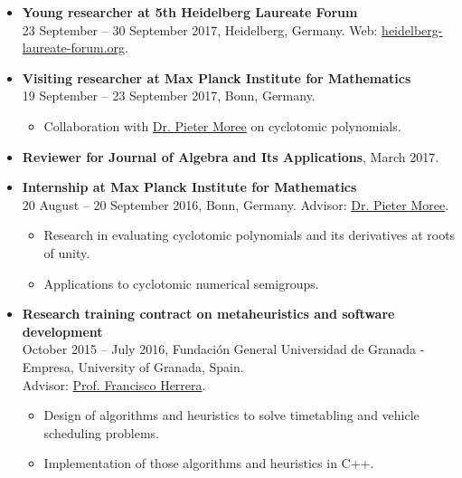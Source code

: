 \documentclass[10pt,a4paper,sans]{moderncv} %
\begin{document}
\begin{itemize}
\item \textbf{Young researcher at 5th Heidelberg Laureate Forum} \\
  23 September -- 30 September 2017, Heidelberg, Germany. Web: \textcolor{colorl}{ \url{heidelberg-laureate-forum.org}}.
\item \textbf{Visiting researcher at Max Planck Institute for Mathematics} \\
  19 September -- 23 September 2017, Bonn, Germany.
\begin{itemize}
\item Collaboration with \textcolor{colorl}{\href{https://www.mpim-bonn.mpg.de/node/95}{Dr. Pieter Moree}} on cyclotomic polynomials.
\end{itemize}
\item \textbf{Reviewer for Journal of Algebra and Its Applications}, March 2017.
\item \textbf{Internship at Max Planck Institute for Mathematics} \\ 20 August -- 20 September 2016, Bonn, Germany. Advisor: \textcolor{colorl}{\href{https://www.mpim-bonn.mpg.de/node/95}{Dr. Pieter Moree}}. 
\begin{itemize}
\item Research in evaluating cyclotomic polynomials and its derivatives at roots of unity.
\item Applications to cyclotomic numerical semigroups.
\end{itemize}
\item \textbf{Research training contract on metaheuristics and software development} \\ October 2015 -- July 2016, Fundación General Universidad de Granada - Empresa, University of Granada, Spain. \\
Advisor: \textcolor{colorl}{\href{https://scholar.google.es/citations?user=HULIk-QAAAAJ&hl=es}{Prof. Francisco Herrera}}.
\begin{itemize}
\item %
  Design of algorithms and heuristics to solve timetabling and vehicle scheduling problems. 
\item Implementation of those algorithms and heuristics in C++.
\end{itemize}
\end{itemize}
\end{document}
